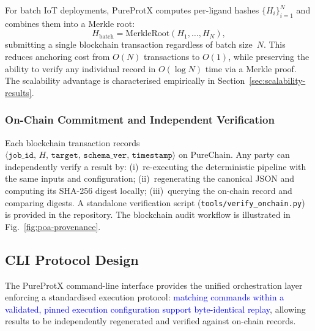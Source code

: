 \documentclass[conference]{IEEEtran}
\newcommand{\rev}[2]{\textcolor{blue}{#2}}
\begin{document}
For batch IoT deployments, PureProtX computes per-ligand
hashes $\{H_i\}_{i=1}^N$ and combines them into a Merkle
root:
\begin{equation}
H_{\mathrm{batch}} = \mathrm{MerkleRoot}(H_1, \ldots, H_N),
\end{equation}
submitting a single blockchain transaction regardless of
batch size~$N$.
This reduces anchoring cost from $O(N)$ transactions to
$O(1)$, while preserving the ability to verify any
individual record in $O(\log N)$ time via a Merkle proof.
The scalability advantage is characterised empirically
in Section~\ref{sec:scalability-results}.

\subsubsection{On-Chain Commitment and Independent Verification}

Each blockchain transaction records
$\langle\texttt{job\_id},\, H,\, \texttt{target},\,
\texttt{schema\_ver},\, \texttt{timestamp}\rangle$
on PureChain.
Any party can independently verify a result by:
(i)~re-executing the deterministic pipeline with the
same inputs and configuration; (ii)~regenerating the
canonical JSON and computing its SHA-256 digest locally;
(iii)~querying the on-chain record and comparing digests.
A standalone verification script (\texttt{tools/verify\_onchain.py})
is provided in the repository.
The blockchain audit workflow is illustrated in
Fig.~\ref{fig:poa-provenance}.

\subsection{\textbf{CLI Protocol Design}}
\label{clidesign}

The PureProtX command-line interface provides the unified
orchestration layer enforcing a standardised execution
protocol: \rev{R1.1}{matching commands within a validated, pinned execution configuration support byte-identical replay}, allowing results to be
independently regenerated and verified against on-chain
records.
\end{document}
